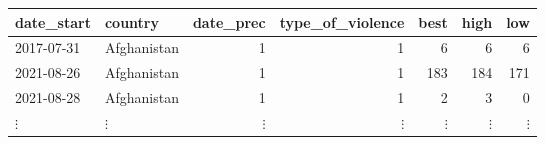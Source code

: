 
\begin{tabular}[t]{llrrrrr}
\toprule
date\_start & country & date\_prec & type\_of\_violence & best & high & low\\
\midrule
2017-07-31 & Afghanistan & 1 & 1 & 6 & 6 & 6\\
2021-08-26 & Afghanistan & 1 & 1 & 183 & 184 & 171\\
2021-08-28 & Afghanistan & 1 & 1 & 2 & 3 & 0\\
$\vdots$ & $\vdots$ & $\vdots$ & $\vdots$ & $\vdots$ & $\vdots$ & $\vdots$ \\ 
 \bottomrule
\end{tabular}